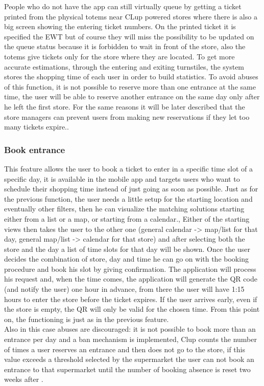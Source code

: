 People who do not have the app can still virtually queue by getting a ticket printed from the physical totems near CLup powered stores where there is also a big screen showing the entering ticket numbers. On the printed ticket it is specified the EWT but of course they will miss the possibility to be updated on the queue status because it is forbidden to wait in front of the store, also the totems give tickets only for the store where they are located.
To get more accurate estimations, through the entering and exiting turnstiles, the system stores the shopping time of each user in order to build statistics. 
To avoid abuses of this function, it is not possible to reserve more than one entrance at the same time, the user will be able to reserve another entrance on the same day only after he left the first store. For the same reasons it will be later described that the store managers can prevent users from making new reservations if they let too many tickets expire..


\subsubsection{\sffamily Book entrance}
This feature allows the user to book a ticket to enter in a specific time slot of a specific day, it is available in the mobile app and targets users who want to schedule their shopping time instead of just going as soon as possible. Just as for the previous function, the user needs a little setup for the starting location and eventually other filters, then he can visualize the matching solutions starting either from a list or a map, or starting from a calendar., Either of the starting views then takes the user to the other one (general calendar -> map/list for that day,  general map/list -> calendar for that store) and after selecting both the store and the day a list of time slots for that day will be shown. Once the user decides the combination of store, day and time he can go on with the booking procedure and book his slot by giving confirmation. The application will process his request and, when the time comes, the application will generate the QR code (and notify the user) one hour in advance, from there the user will have 1:15 hours to enter the store before the ticket expires. If the user arrives early, even if the store is empty, the QR will only be valid for the chosen time. From this point on, the functioning is just as in the previous feature.\\
Also in this case abuses are discouraged: it is not possible to book more than an entrance per day and a ban mechanism is implemented, Clup counts the number of times a user reserves an entrance and then does not go to the store, if this value exceeds a threshold selected by the supermarket the user can not book an entrance to that supermarket until the number of booking absence is reset two weeks after  .

